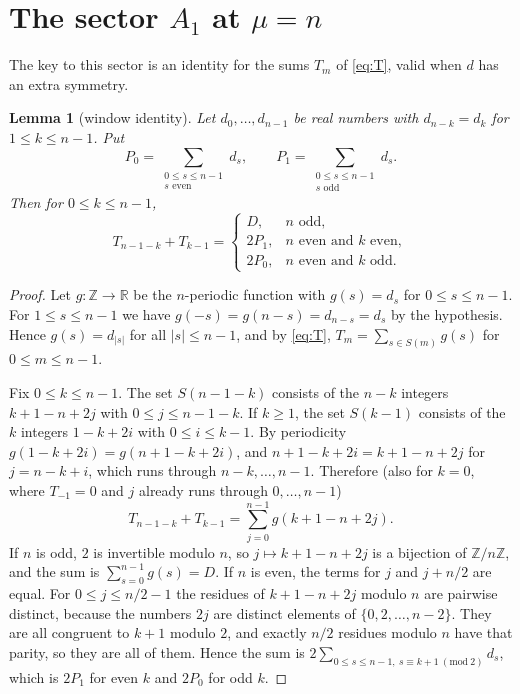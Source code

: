 \documentclass[11pt]{amsart}
\theoremstyle{plain}
\newtheorem{lemma}{Lemma}
\theoremstyle{definition}
\theoremstyle{remark}
\numberwithin{equation}{section}
\newcommand{\R}{\mathbb{R}}
\newcommand{\Z}{\mathbb{Z}}
\newcommand{\abs}[1]{\lvert #1\rvert}
\begin{document}
\section{The sector \texorpdfstring{\(A_1\)}{A1} at
\texorpdfstring{\(\mu=n\)}{mu=n}}\label{sec:A1}

The key to this sector is an identity for the sums \(T_m\) of \eqref{eq:T}, valid when
\(d\) has an extra symmetry.

\begin{lemma}[window identity]\label{lem:window}
Let \(d_0,\dots,d_{n-1}\) be real numbers with \(d_{n-k}=d_k\) for \(1\le k\le n-1\). Put
\[
P_0=\sum_{\substack{0\le s\le n-1\\ s\text{ even}}}d_s,\qquad
P_1=\sum_{\substack{0\le s\le n-1\\ s\text{ odd}}}d_s.
\]
Then for \(0\le k\le n-1\),
\[
T_{n-1-k}+T_{k-1}=
\begin{cases}
D, & n\text{ odd},\\
2P_1, & n\text{ even and } k\text{ even},\\
2P_0, & n\text{ even and } k\text{ odd}.
\end{cases}
\]
\end{lemma}

\begin{proof}
Let \(g\colon\Z\to\R\) be the \(n\)-periodic function with \(g(s)=d_s\) for
\(0\le s\le n-1\). For \(1\le s\le n-1\) we have \(g(-s)=g(n-s)=d_{n-s}=d_s\) by the
hypothesis. Hence \(g(s)=d_{\abs{s}}\) for all \(\abs{s}\le n-1\), and by \eqref{eq:T},
\(T_m=\sum_{s\in S(m)}g(s)\) for \(0\le m\le n-1\).

Fix \(0\le k\le n-1\). The set \(S(n-1-k)\) consists of the \(n-k\) integers
\(k+1-n+2j\) with \(0\le j\le n-1-k\). If \(k\ge1\), the set \(S(k-1)\) consists of the
\(k\) integers \(1-k+2i\) with \(0\le i\le k-1\). By periodicity
\(g(1-k+2i)=g(n+1-k+2i)\), and \(n+1-k+2i=k+1-n+2j\) for \(j=n-k+i\), which runs through
\(n-k,\dots,n-1\). Therefore (also for \(k=0\), where \(T_{-1}=0\) and \(j\) already runs
through \(0,\dots,n-1\))
\[
T_{n-1-k}+T_{k-1}=\sum_{j=0}^{n-1}g(k+1-n+2j).
\]
If \(n\) is odd, \(2\) is invertible modulo \(n\), so \(j\mapsto k+1-n+2j\) is a
bijection of \(\Z/n\Z\), and the sum is \(\sum_{s=0}^{n-1}g(s)=D\). If \(n\) is even, the
terms for \(j\) and \(j+n/2\) are equal. For \(0\le j\le n/2-1\) the residues of
\(k+1-n+2j\) modulo \(n\) are pairwise distinct, because the numbers \(2j\) are distinct
elements of \(\{0,2,\dots,n-2\}\). They are all congruent to \(k+1\) modulo \(2\), and
exactly \(n/2\) residues modulo \(n\) have that parity, so they are all of them. Hence the
sum is \(2\sum_{0\le s\le n-1,\ s\equiv k+1\ (\mathrm{mod}\ 2)}d_s\), which is \(2P_1\) for even
\(k\) and \(2P_0\) for odd \(k\).
\end{proof}
\end{document}
